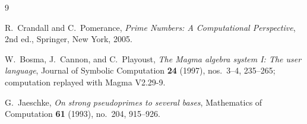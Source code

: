 \documentclass[11pt]{amsart}%
\begin{document}
\begin{thebibliography}{9}

R.~Crandall and C.~Pomerance,
\emph{Prime Numbers: A Computational Perspective}, 2nd ed.,
Springer, New York, 2005.

W.~Bosma, J.~Cannon, and C.~Playoust,
\emph{The Magma algebra system I: The user language},
Journal of Symbolic Computation \textbf{24} (1997), nos.~3--4,
235--265; computation replayed with Magma V2.29-9.

G.~Jaeschke,
\emph{On strong pseudoprimes to several bases},
Mathematics of Computation \textbf{61} (1993), no.~204, 915--926.

\end{thebibliography}
\end{document}
